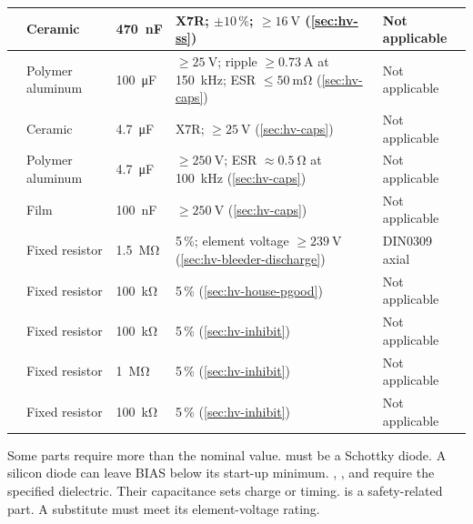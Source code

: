 {\begin{longtable}{|L{0.11\textwidth}|L{0.13\textwidth}|L{0.10\textwidth}|L{0.33\textwidth}|L{0.13\textwidth}|}
  \hline
   & Ceramic & \SI{470}{\nano\farad} & X7R; $\pm10\,\%$; $\geq\SI{16}{\volt}$ (\cref{sec:hv-ss}) & Not applicable \\
  \hline
   & Polymer aluminum & \SI{100}{\micro\farad} & $\geq\SI{25}{\volt}$; ripple $\geq\SI{0.73}{\ampere}$ at \SI{150}{\kilo\hertz}; ESR $\leq\SI{50}{\milli\ohm}$ (\cref{sec:hv-caps}) & Not applicable \\
  \hline
   & Ceramic & \SI{4.7}{\micro\farad} & X7R; $\geq\SI{25}{\volt}$ (\cref{sec:hv-caps}) & Not applicable \\
  \hline
   & Polymer aluminum & \SI{4.7}{\micro\farad} & $\geq\SI{250}{\volt}$; ESR $\approx\SI{0.5}{\ohm}$ at \SI{100}{\kilo\hertz} (\cref{sec:hv-caps}) & Not applicable \\
  \hline
   & Film & \SI{100}{\nano\farad} & $\geq\SI{250}{\volt}$ (\cref{sec:hv-caps}) & Not applicable \\
  \hline
   & Fixed resistor & \SI{1.5}{\mega\ohm} & 5\,\%; element voltage $\geq\SI{239}{\volt}$ (\cref{sec:hv-bleeder-discharge}) & DIN0309 axial \\
  \hline
   & Fixed resistor & \SI{100}{\kilo\ohm} & 5\,\% (\cref{sec:hv-house-pgood}) & Not applicable \\
\hline
{} & Fixed resistor & \SI{100}{\kilo\ohm} & 5\,\% (\cref{sec:hv-inhibit}) & Not applicable \\
\hline
{} & Fixed resistor & \SI{1}{\mega\ohm} & 5\,\% (\cref{sec:hv-inhibit}) & Not applicable \\
\hline
{} & Fixed resistor & \SI{100}{\kilo\ohm} & 5\,\% (\cref{sec:hv-inhibit}) & Not applicable \\
\hline
\end{longtable}
}

Some parts require more than the nominal value.  must be a
Schottky diode. A silicon diode can leave BIAS below its start-up minimum.
, , and  require the specified
dielectric. Their capacitance sets charge or timing.  is a
safety-related part. A substitute must meet its element-voltage rating.

